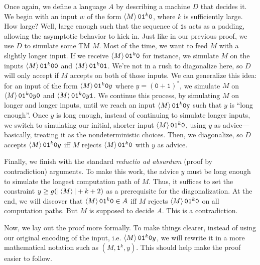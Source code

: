 \documentclass[11pt,twoside=off,numbers=noenddot]{scrbook}
\begin{document}
\begin{proofidea}
  Once again, we define a language $A$ by describing a machine $D$ that decides it. We begin with an input $w$ of the form $\left< M \right>\texttt{0}\texttt{1}^k\texttt{0}$, where $k$ is sufficiently large. How large? Well, large enough such that the sequence of $\texttt{1}$s acts as a padding, allowing the asymptotic behavior to kick in. Just like in our previous proof, we use $D$ to simulate some TM $M$. Most of the time, we want to feed $M$ with a slightly longer input. If we receive $\left< M \right>\texttt{0}\texttt{1}^k\texttt{0}$ for instance, we simulate $M$ on the inputs $\left< M \right>\texttt{0}\texttt{1}^{k}\texttt{0}\texttt{0}$ and $\left< M \right>\texttt{0}\texttt{1}^{k}\texttt{0}\texttt{1}$. We're not in a rush to diagonalize here, so $D$ will only accept if $M$ accepts on both of those inputs. We can generalize this idea: for an input of the form $\left< M \right>\texttt{0}\texttt{1}^{k}\texttt{0}y$ where $y = (\texttt{0} + \texttt{1})^\ast$, we simulate $M$ on $\left< M \right>\texttt{0}\texttt{1}^{k}\texttt{0}y\texttt{0}$ and $\left< M \right>\texttt{0}\texttt{1}^{k}\texttt{0}y\texttt{1}$. We continue this process, by simulating $M$ on longer and longer inputs, until we reach an input $\left< M \right>\texttt{0}\texttt{1}^k\texttt{0}\texttt{y}$ such that $y$ is ``long enough''. Once $y$ is long enough, instead of continuing to simulate longer inputs, we switch to simulating our initial, shorter input $\left< M \right>\texttt{0}\texttt{1}^k\texttt{0}$, using $y$ as advice—basically, treating it as the nondeterministic choices. Then, we diagonalize, so $D$ accepts $\left< M \right>\texttt{0}\texttt{1}^k\texttt{0}y$ iff $M$ rejects $\left< M \right>\texttt{0}\texttt{1}^k\texttt{0}$ with $y$ as advice.

  Finally, we finish with the standard \textit{reductio ad absurdum} (proof by contradiction) arguments. To make this work, the advice $y$ must be long enough to simulate the longest computation path of $M$. Thus, it suffices to set the constraint $y \geq g(| \left< M \right> | + k + 2)$ as a prerequisite for the diagonalization. At the end, we will discover that $\left< M \right>\texttt{0}\texttt{1}^k\texttt{0} \in A$ iff $M$ rejects $\left< M \right>\texttt{0}\texttt{1}^k\texttt{0}$ on all computation paths. But $M$ is supposed to decide $A$. This is a contradiction.
\end{proofidea}

Now, we lay out the proof more formally. To make things clearer, instead of using our original encoding of the input, i.e. $\left< M \right>\texttt{0}\texttt{1}^k\texttt{0}y$, we will rewrite it in a more mathematical notation such as $(M, \texttt{1}^k, y)$. This should help make the proof easier to follow.
\end{document}
